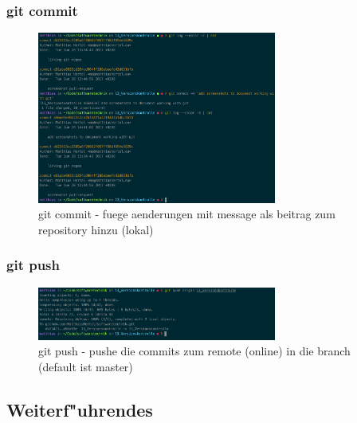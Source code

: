 \documentclass[12pt]{article}
\begin{document}
\subsubsection{git commit}
\begin{figure}[H]
  \centering
  \includegraphics[width=0.7\textwidth]{./img/git_commit.png}
  \captionsetup{name=Abb.,font=footnotesize}
  \caption{git commit - fuege aenderungen mit message als beitrag zum repository hinzu (lokal)}
\end{figure}
\subsubsection{git push}
\begin{figure}[H]
  \centering
  \includegraphics[width=0.7\textwidth]{./img/git_push.png}
  \captionsetup{name=Abb.,font=footnotesize}
  \caption{git push - pushe die commits zum remote (online) in die branch (default ist master)}
\end{figure}


\subsection{Weiterf"uhrendes}
\end{document}
